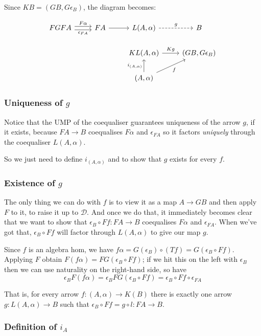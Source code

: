 \documentclass[11pt]{amsart}
\begin{document}
Since $KB = (GB, G \epsilon_B)$, the diagram becomes:

\[
\begin{tikzcd}
FGFA
    \arrow[r, shift left, "F \alpha"]
    \arrow[r, shift right, "\epsilon_{F A}"']
& F A
    \arrow[r]
& L(A, \alpha)
    \arrow[r, dashrightarrow, "g"]
& B
\\
& & KL(A, \alpha)
    \arrow[r, "Kg"]
& (GB, G \epsilon_B)
\\
& & (A, \alpha)
    \arrow[u, "i_{(A, \alpha)}"]
    \arrow[ur, "f"']
&
\end{tikzcd}
\]

\subsubsection{Uniqueness of $g$}

Notice that the UMP of the coequaliser guarantees uniqueness of the arrow $g$, if it exists, because $FA \to B$ coequalises $F\alpha$ and $\epsilon_{FA}$ so it factors \emph{uniquely} through the coequaliser $L(A, \alpha)$.

So we just need to define $i_{(A, \alpha)}$ and to show that $g$ exists for every $f$.

\subsubsection{Existence of $g$}

The only thing we can do with $f$ is to view it as a map $A \to GB$ and then apply $F$ to it, to raise it up to $\mathcal{D}$.
And once we do that, it immediately becomes clear that we want to show that $\epsilon_B \circ Ff: FA \to B$ coequalises $F\alpha$ and $\epsilon_{FA}$.
When we've got that, $\epsilon_B \circ Ff$ will factor through $L(A, \alpha)$ to give our map $g$.

Since $f$ is an algebra hom, we have $f \alpha = G(\epsilon_B) \circ (Tf) = G(\epsilon_B \circ Ff)$.
Applying $F$ obtain $F(f \alpha) = FG(\epsilon_B \circ Ff)$; if we hit this on the left with $\epsilon_B$ then we can use naturality on the right-hand side, so have $$\epsilon_B F(f \alpha) = \epsilon_B FG(\epsilon_B \circ Ff) = \epsilon_B \circ Ff \circ \epsilon_{FA}$$

That is, for every arrow $f: (A, \alpha) \to K(B)$ there is exactly one arrow $g: L(A, \alpha) \to B$ such that $\epsilon_B \circ Ff = g \circ l: FA \to B$.

\subsubsection{Definition of $i_A$}
\end{document}

